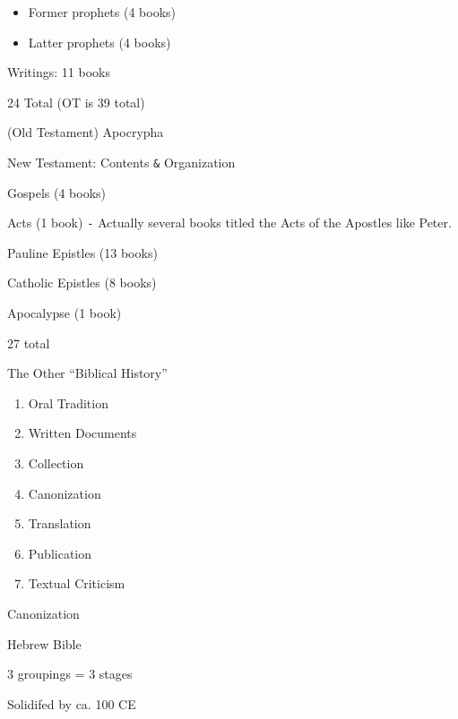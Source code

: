 \documentclass{article}
\begin{document}
    \begin{itemize}
        \item Former prophets (4 books)
        \item Latter prophets (4 books)
    \end{itemize}

    Writings: 11 books

    24 Total (OT is 39 total)

    (Old Testament) Apocrypha

\centerline{New Testament: Contents \texttt{\&} Organization}

    Gospels (4 books)

    Acts (1 book) \texttt{-} Actually several books titled the Acts of the Apostles like Peter.

    Pauline Epistles (13 books)

    Catholic Epistles (8 books)

    Apocalypse (1 book)

    27 total

\centerline{The Other ``Biblical History''}

    \begin{enumerate}
        \item Oral Tradition
        \item Written Documents
        \item Collection
        \item Canonization
        \item Translation
        \item Publication
        \item Textual Criticism
    \end{enumerate}

\centerline{Canonization}

    Hebrew Bible

    3 groupings = 3 stages

    Solidifed by ca. 100 CE
\end{document}

